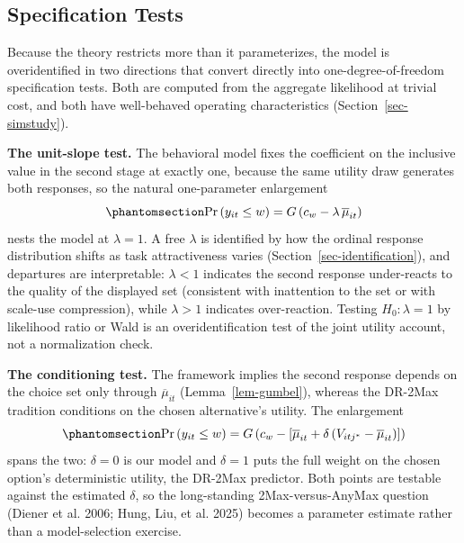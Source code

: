 \documentclass[
  letterpaper,
  DIV=11,
  numbers=noendperiod]{scrartcl}
\theoremstyle{plain}
\theoremstyle{plain}
\theoremstyle{remark}
\begin{document}
\subsection{Specification Tests}\label{sec-spectests}

Because the theory restricts more than it parameterizes, the model is
overidentified in two directions that convert directly into
one-degree-of-freedom specification tests. Both are computed from the
aggregate likelihood at trivial cost, and both have well-behaved
operating characteristics (Section~\ref{sec-simstudy}).

\textbf{The unit-slope test.} The behavioral model fixes the coefficient
on the inclusive value in the second stage at exactly one, because the
same utility draw generates both responses, so the natural one-parameter
enlargement \begin{equation}\protect\phantomsection\label{eq-lambda}{
\Pr \left( y_{it} \le w \right) = G \left( c_w - \lambda \, \overline{\mu}_{it} \right)
}\end{equation} nests the model at \(\lambda = 1\). A free \(\lambda\)
is identified by how the ordinal response distribution shifts as task
attractiveness varies (Section~\ref{sec-identification}), and departures
are interpretable: \(\lambda < 1\) indicates the second response
under-reacts to the quality of the displayed set (consistent with
inattention to the set or with scale-use compression), while
\(\lambda > 1\) indicates over-reaction. Testing \(H_0\!: \lambda = 1\)
by likelihood ratio or Wald is an overidentification test of the joint
utility account, not a normalization check.

\textbf{The conditioning test.} The framework implies the second
response depends on the choice set only through \(\overline{\mu}_{it}\)
(Lemma~\ref{lem-gumbel}), whereas the DR-2Max tradition conditions on
the chosen alternative's utility. The enlargement
\begin{equation}\protect\phantomsection\label{eq-delta}{
\Pr \left( y_{it} \le w \right) = G \left( c_w - \left[ \overline{\mu}_{it} + \delta \left( V_{itj^*} - \overline{\mu}_{it} \right) \right] \right)
}\end{equation} spans the two: \(\delta = 0\) is our model and
\(\delta = 1\) puts the full weight on the chosen option's deterministic
utility, the DR-2Max predictor. Both points are testable against the
estimated \(\delta\), so the long-standing 2Max-versus-AnyMax question
(Diener et al. 2006; Hung, Liu, et al. 2025) becomes a parameter
estimate rather than a model-selection exercise.
\end{document}
